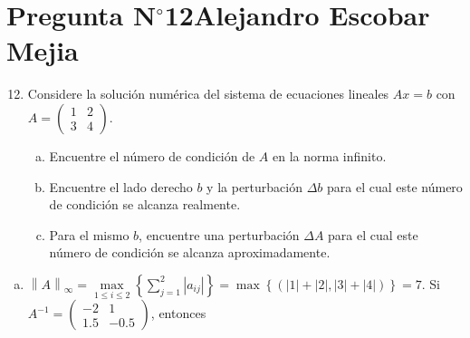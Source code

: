 \section{Pregunta N$^{\circ}$12\qquad Alejandro Escobar Mejia}

\begin{frame}
	\begin{enumerate}\setcounter{enumi}{11}
		\item

		      Considere la solución numérica del sistema de ecuaciones
		      lineales $Ax=b$ con
		      \begin{math}
			      A=
			      \begin{pmatrix}
				      1 & 2 \\
				      3 & 4
			      \end{pmatrix}.
		      \end{math}

		      \begin{enumerate}[a)]
			      \item

			            Encuentre el número de condición de $A$ en la norma
			            infinito.

			      \item

			            Encuentre el lado derecho $b$ y la perturbación
			            $\Delta b$ para el cual este número de condición se
			            alcanza realmente.

			      \item

			            Para el mismo $b$, encuentre una perturbación
			            $\Delta A$ para el cual este número de condición se
			            alcanza aproximadamente.
		      \end{enumerate}
	\end{enumerate}
	\begin{solution}
		\begin{enumerate}[a)]
			\item
			      \begin{math}
				      {\left\|A\right\|}_{\infty}=
				      \max\limits_{1\leq i\leq 2}
				      \left\{
				      \sum\limits_{j=1}^{2}\left|a_{ij}\right|
				      \right\}=
				      \max\left\{\left(\left|1\right|+\left|2\right|,\left|3\right|+\left|4\right|\right)\right\}=
				      7
			      \end{math}.
			      Si
			      \begin{math}
				      A^{-1}=
				      \begin{pmatrix}
					      -2  & 1    \\
					      1.5 & -0.5
				      \end{pmatrix}
			      \end{math},
			      entonces


\end{enumerate}
\end{solution}
\end{frame}
